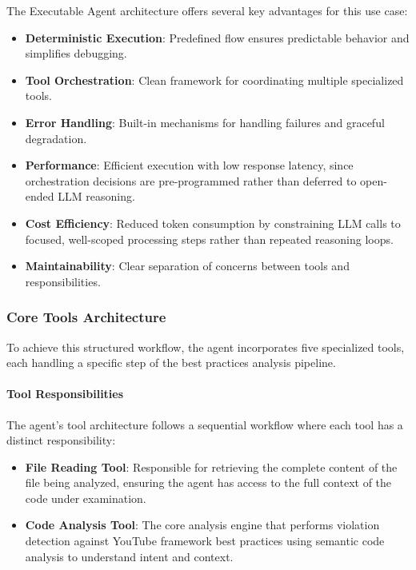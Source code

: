 \begin{spacing}{1.2}
The Executable Agent architecture offers several key advantages for this use case:
\begin{itemize}
    \item \textbf{Deterministic Execution}: Predefined flow ensures predictable behavior and simplifies debugging.
    \item \textbf{Tool Orchestration}: Clean framework for coordinating multiple specialized tools.
    \item \textbf{Error Handling}: Built-in mechanisms for handling failures and graceful degradation.
    \item \textbf{Performance}: Efficient execution with low response latency, since orchestration decisions are pre-programmed rather than deferred to open-ended LLM reasoning.
    \item \textbf{Cost Efficiency}: Reduced token consumption by constraining LLM calls to focused, well-scoped processing steps rather than repeated reasoning loops.
    \item \textbf{Maintainability}: Clear separation of concerns between tools and responsibilities.
\end{itemize}



\subsubsection{Core Tools Architecture}
To achieve this structured workflow, the agent incorporates five specialized tools, each handling a specific step of the best practices analysis pipeline.

\paragraph{Tool Responsibilities}
The agent's tool architecture follows a sequential workflow where each tool has a distinct responsibility:

\begin{itemize}
    \item \textbf{File Reading Tool}: Responsible for retrieving the complete content of the file being analyzed, ensuring the agent has access to the full context of the code under examination.
    
    \item \textbf{Code Analysis Tool}: The core analysis engine that performs violation detection against YouTube framework best practices using semantic code analysis to understand intent and context.
    

\end{itemize}
\end{spacing}
